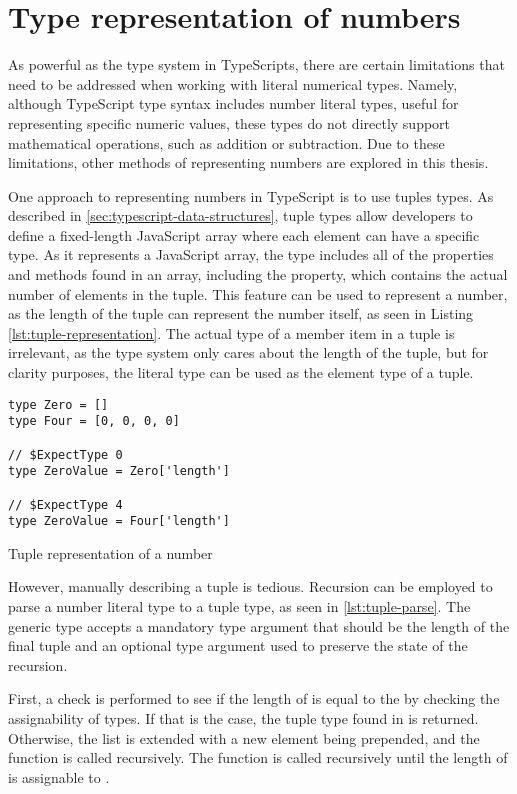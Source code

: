 \section{Type representation of numbers}

As powerful as the type system in TypeScripts, there are certain limitations that need to be addressed when working with literal numerical types. Namely, although TypeScript type syntax includes number literal types, useful for representing specific numeric values, these types do not directly support mathematical operations, such as addition or subtraction. Due to these limitations, other methods of representing numbers are explored in this thesis.

One approach to representing numbers in TypeScript is to use tuples types. As described in \ref{sec:typescript-data-structures}, tuple types allow developers to define a fixed-length JavaScript array where each element can have a specific type. As it represents a JavaScript array, the type includes all of the properties and methods found in an array, including the  property, which contains the actual number of elements in the tuple. This feature can be used to represent a number, as the length of the tuple can represent the number itself, as seen in Listing \ref{lst:tuple-representation}. The actual type of a member item in a tuple is irrelevant, as the type system only cares about the length of the tuple, but for clarity purposes, the literal type  can be used as the element type of a tuple.

\begin{listing}[ht]
  \begin{verbatim}
type Zero = []
type Four = [0, 0, 0, 0] 

// $ExpectType 0
type ZeroValue = Zero['length']

// $ExpectType 4
type ZeroValue = Four['length']
\end{verbatim}
  \caption{Tuple representation of a number}\label{lst:tuple-representation}
\end{listing}

However, manually describing a tuple is tedious. Recursion can be employed to parse a number literal type to a tuple type, as seen in \ref{lst:tuple-parse}. The  generic type accepts a mandatory type argument  that should be the length of the final tuple and an optional type argument  used to preserve the state of the recursion.

First, a check is performed to see if the length of  is equal to the  by checking the assignability of types. If that is the case, the tuple type found in  is returned. Otherwise, the list is extended with a new  element being prepended, and the function is called recursively. The function is called recursively until the length of  is assignable to .

